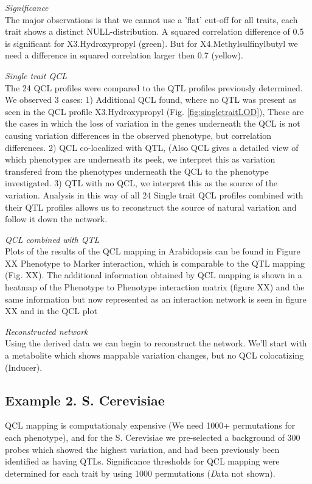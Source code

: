 \documentclass[12pt]{article}
\begin{document}
  \emph{\sffamily Significance}\\
  The major observations is that we cannot use a 'flat' cut-off for all traits, each 
  trait shows a distinct NULL-distribution. A squared correlation difference of 0.5 is 
  significant for X3.Hydroxypropyl (green). But for X4.Methylsulfinylbutyl we need a 
  difference in squared correlation larger then 0.7 (yellow).
  
  \emph{\sffamily Single trait QCL}\\
  The 24 QCL profiles were compared to the QTL profiles previously determined. We observed 3 cases:
  1) Additional QCL found, where no QTL was present as seen in the QCL profile X3.Hydroxypropyl (Fig. \ref{fig:singletraitLOD}), 
  These are the cases in which the loss of variation in the genes underneath the QCL is not causing 
  variation differences in the observed phenotype, but correlation differences.
  2) QCL co-localized with QTL, (Also QCL gives a detailed view of which phenotypes are underneath its peek, we 
  interpret this as variation transfered from the phenotypes underneath the QCL to the phenotype investigated.
  3) QTL with no QCL, we interpret this as the source of the variation.
  Analysis in this way of all 24 Single trait QCL profiles combined with their QTL profiles 
  allows us to reconstruct the source of natural variation and follow it down the network.
  
  \emph{\sffamily QCL combined with QTL}\\
  Plots of the results of the QCL mapping in Arabidopsis can be found in 
  Figure XX Phenotype to Marker interaction, which is comparable to the QTL mapping 
  (Fig. XX). The additional information obtained by QCL mapping is shown in a heatmap 
  of the Phenotype to Phenotype interaction matrix (figure XX) and the same information 
  but now represented as an interaction network is seen in figure XX and in the QCL plot
  
  \emph{\sffamily Reconstructed network}\\
  Using the derived data we can begin to reconstruct the network. We'll start with a metabolite 
  which shows mappable variation changes, but no QCL colocatizing (Inducer).
  
  \subsection{Example 2. S. Cerevisiae}
  QCL mapping is computationaly expensive (We need 1000+ permutations for each phenotype), 
  and for the S. Cerevisiae we pre-selected a background of 300 probes which showed the 
  highest variation, and had been previously been identified as having QTLs. Significance 
  thresholds for QCL mapping were determined for each trait by using 1000 permutations 
  ({\emph Data not shown}).
  
\end{document}
